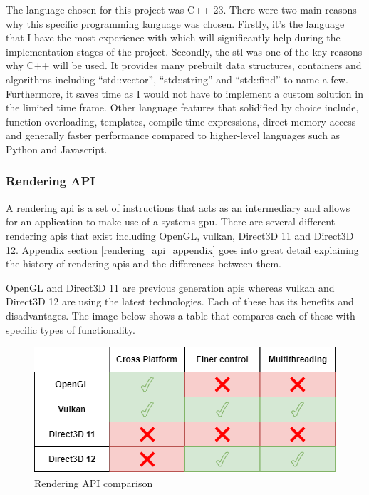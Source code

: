 \documentclass[11pt]{article}
\begin{document}
The language chosen for this project was C++ 23.  There were two main reasons
why this specific programming language was chosen. Firstly, it's the language
that I have the most experience with which will significantly help during the
implementation stages of the project. Secondly, the \gls*{stl}  was one of the
key reasons why C++ will be used. It provides many prebuilt data structures,
containers and algorithms including ``std::vector'', ``std::string'' and
``std::find'' to name a few. Furthermore, it saves time as I would not have to
implement a custom solution in the limited time frame. Other language features
that solidified by choice include, function overloading, templates, compile-time
expressions, direct memory access and generally faster performance compared to
higher-level languages such as Python and Javascript.

\subsubsection{Rendering API} \label{rendering_api}
A rendering \gls*{api} is a set of instructions that acts as an intermediary and
allows for an application to make use of a systems \gls*{gpu}. There are several
different rendering \glspl*{api} that exist including OpenGL, \gls*{vulkan},
Direct3D 11 and Direct3D 12. Appendix section \ref{rendering_api_appendix} goes
into great detail explaining the history of rendering \glspl*{api} and the
differences between them.

OpenGL and Direct3D 11 are previous generation \glspl*{api} whereas \gls*{vulkan}
and Direct3D 12 are using the latest technologies. Each of these has its
benefits and disadvantages. The image below shows a table that compares each of
these with specific types of functionality. 
\begin{figure}[H]
  \centering
  \includegraphics[width=\textwidth]{images/api_comparison.png}
  \caption{Rendering API comparison}
  \label{fig:api_comparison}
\end{figure}
\end{document}
